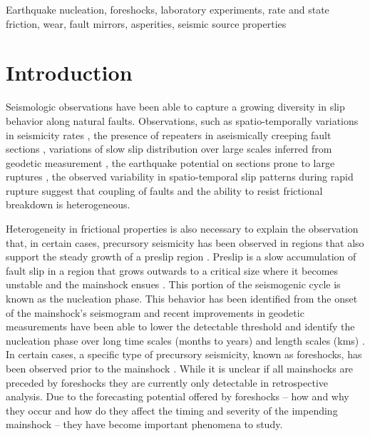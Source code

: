 \documentclass[preprint,1p, 10pt,authoryear]{elsarticle}
\begin{document}
\begin{frontmatter}
\begin{keyword}
Earthquake nucleation, foreshocks, laboratory experiments, rate and state friction, wear, fault mirrors, asperities, seismic source properties
\end{keyword}

\end{frontmatter}
\doublespacing
\linenumbers



\section{Introduction}
\label{int}
Seismologic observations have been able to capture a growing diversity in slip behavior along natural faults. Observations, such as spatio-temporally variations in seismicity rates \citep{Tormann2014, Tormann2015, Gulia2016,Gulia2019}, the presence of repeaters in aseismically creeping fault sections \citep[e.g.][]{Nadeau1994, Nadeau1999, Shirzaei2013, Uchida2019}, variations of slow slip distribution over large scales inferred from geodetic measurement  \citep[e.g.][]{Brodsky2014, Ruiz2014, Socquet2017}, the earthquake potential on sections prone to large ruptures \citep{Buergmann2000,Buergmann2004}, the observed variability in spatio-temporal slip patterns during rapid rupture \citep[e.g.][]{Mai2002, Tinti2005, Dreger2007, Galvez2016, Mai2018} suggest that coupling of faults and the ability to resist frictional breakdown is heterogeneous. 

Heterogeneity in frictional properties is also necessary to explain the observation that, in certain cases, precursory seismicity has been observed in regions that also support the steady growth of a preslip region \citep{Kato2012, Kato2016, Obara2016, Ruiz2014, Bouchon2013,Buergmann2004}. Preslip is a slow accumulation of fault slip in a region that grows outwards to a critical size where it becomes unstable and the mainshock ensues \citep{Ohnaka1992,Ben-Zion2008}. This portion of the seismogenic cycle is known as the nucleation phase. This behavior has been identified from the onset of the mainshock's seismogram \citep{Iio1995, Ellsworth1995, Beroza1996} and recent improvements in geodetic measurements have been able to lower the detectable threshold and identify the nucleation phase over long time scales (months to years) and length scales (kms) \citep[e.g.,][]{Roeloffs2006,Ruiz2014, Socquet2017}.  In certain cases, a specific type of precursory seismicity, known as foreshocks, has been observed prior to the mainshock \citep[e.g.,][]{Dodge1995, Dodge1996, Bouchon2011}. While it is unclear if all mainshocks are preceded by foreshocks \citep{Brodsky2014, Mignan2014, Seif2018} they are currently only detectable in retrospective analysis. Due to the forecasting potential offered by foreshocks -- how and why they occur and how do they affect the timing and severity of the impending mainshock -- they have become important phenomena to study.
\end{document}
